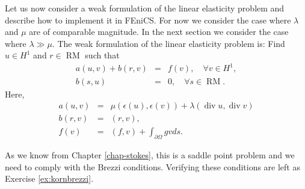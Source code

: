 Let us now consider a weak formulation of the linear elasticity problem and describe how to implement
it in FEniCS. For now we consider the case where $\lambda$ and $\mu$ are of comparable magnitude. In
the next section we consider the case where $\lambda \gg \mu$.
The weak formulation of the linear elasticity problem is:
Find $u\in H^1$ and $r \in \operatorname{RM}$ such that
\begin{eqnarray}
\label{el:lm:1}
a(u,v) + b(r, v) &=& f(v), \quad \forall v\in H^1, \\
\label{el:lm:2}
b(s,u) &=& 0, \quad \forall s \in \operatorname{RM}.
\end{eqnarray}
Here,
\begin{eqnarray}
a(u,v) &=& \mu (\epsilon(u), \epsilon(v)) + \lambda (\operatorname{div} u, \operatorname{div} v)  \\
b(r, v) &=& (r, v), \\
f(v) &=& (f,v) + \int_{\partial \Omega} g v ds .
\end{eqnarray}

As we know from Chapter \ref{chap-stokes}, this is a saddle point problem and we need to
comply with the Brezzi conditions. Verifying these conditions are left as Exercise \ref{ex:kornbrezzi}.

